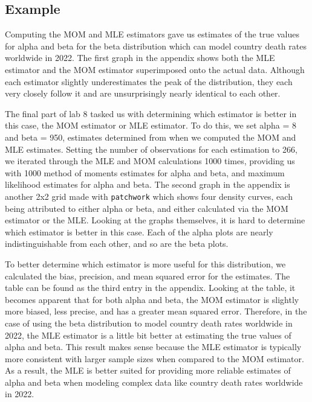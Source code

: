 \documentclass{article}\usepackage[]{graphicx}\usepackage[]{xcolor}
\begin{document}
\begin{multicols}{2}
\section{Example}
Computing the MOM and MLE estimators gave us estimates of the true values for alpha and beta for the beta distribution which can model country death rates worldwide in 2022. The first graph in the appendix shows both the MLE estimator and the MOM estimator superimposed onto the actual data. Although each estimator slightly underestimates the peak of the distribution, they each very closely follow it and are unsurprisingly nearly identical to each other. 

\indent
The final part of lab 8 tasked us with determining which estimator is better in this case, the MOM estimator or MLE estimator. To do this, we set alpha = 8 and beta = 950, estimates determined from when we computed the MOM and MLE estimates. Setting the number of observations for each estimation to 266, we iterated through the MLE and MOM calculations 1000 times, providing us with 1000 method of moments estimates for alpha and beta, and maximum likelihood estimates for alpha and beta. The second graph in the appendix is another 2x2 grid made with \texttt{patchwork} which shows four density curves, each being attributed to either alpha or beta, and either calculated via the MOM estimator or the MLE. Looking at the graphs themselves, it is hard to determine which estimator is better in this case. Each of the alpha plots are nearly indistinguishable from each other, and so are the beta plots.

\indent
To better determine which estimator is more useful for this distribution, we calculated the bias, precision, and mean squared error
for the estimates. The table can be found as the third entry in the appendix. Looking at the table, it becomes apparent that for both alpha and beta, the MOM estimator is slightly more biased, less precise, and has a greater mean squared error. Therefore, in the case of using the beta distribution to model country death rates worldwide in 2022, the MLE estimator is a little bit better at estimating the true values of alpha and beta. This result makes sense because the MLE estimator is typically more consistent with larger sample sizes when compared to the MOM estimator. As a result, the MLE is better suited for providing more reliable estimates of alpha and beta when modeling complex data like country death rates worldwide in 2022.


\end{multicols}
\end{document}
